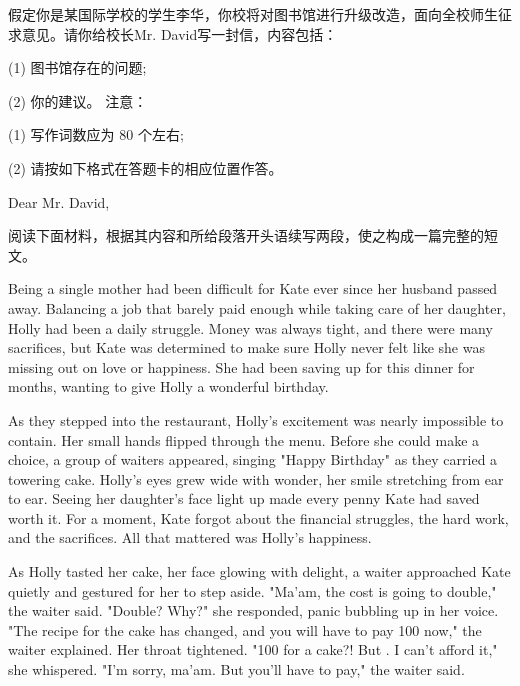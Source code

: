\documentclass{英语试卷}
\begin{document}
\par 假定你是某国际学校的学生李华，你校将对图书馆进行升级改造，面向全校师生征求意见。请你给校长Mr. David写一封信，内容包括：\par
\par (1) 图书馆存在的问题;\par
\par (2) 你的建议。 注意：\par
\par (1) 写作词数应为 80 个左右;\par
\par (2) 请按如下格式在答题卡的相应位置作答。\par
\par Dear Mr. David,\par
{}
\par 阅读下面材料，根据其内容和所给段落开头语续写两段，使之构成一篇完整的短文。\par
\par Being a single mother had been difficult for Kate ever since her husband passed away. Balancing a job that barely paid enough while taking care of her daughter, Holly had been a daily struggle. Money was always tight, and there were many sacrifices, but Kate was determined to make sure Holly never felt like she was missing out on love or happiness. She had been saving up for this dinner for months, wanting to give Holly a wonderful birthday.\par
\par As they stepped into the restaurant, Holly's excitement was nearly impossible to contain. Her small hands flipped through the menu. Before she could make a choice, a group of waiters appeared, singing "Happy Birthday" as they carried a towering cake. Holly's eyes grew wide with wonder, her smile stretching from ear to ear. Seeing her daughter's face light up made every penny Kate had saved worth it. For a moment, Kate forgot about the financial struggles, the hard work, and the sacrifices. All that mattered was Holly's happiness.\par
\par As Holly tasted her cake, her face glowing with delight, a waiter approached Kate quietly and gestured for her to step aside. "Ma'am, the cost is going to double," the waiter said. "Double? Why?" she responded, panic bubbling up in her voice. "The recipe for the cake has changed, and you will have to pay 100 now," the waiter explained. Her throat tightened. "100 for a cake?! But . I can't afford it," she whispered. "I'm sorry, ma'am. But you'll have to pay," the waiter said.\par
\end{document}
